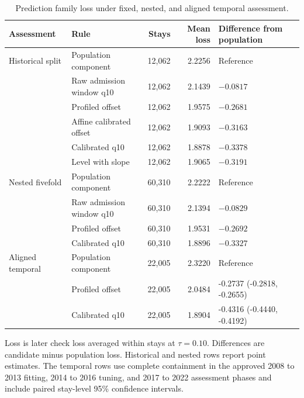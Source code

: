 \begin{table}[!htbp]
\caption{Prediction family loss under fixed, nested, and aligned temporal assessment.}
\label{tab:primary_prediction_comparison}
\centering
\footnotesize
\setlength{\tabcolsep}{4pt}
\begin{tabular}{llrrl}
\toprule
Assessment & Rule & Stays & Mean loss & Difference from population\\
\midrule
Historical split & Population component & 12,062 & 2.2256 & Reference\\
 & Raw admission window q10 & 12,062 & 2.1439 & $-0.0817$\\
 & Profiled offset & 12,062 & 1.9575 & $-0.2681$\\
 & Affine calibrated offset & 12,062 & 1.9093 & $-0.3163$\\
 & Calibrated q10 & 12,062 & 1.8878 & $-0.3378$\\
 & Level with slope & 12,062 & 1.9065 & $-0.3191$\\
\addlinespace
Nested fivefold & Population component & 60,310 & 2.2222 & Reference\\
 & Raw admission window q10 & 60,310 & 2.1394 & $-0.0829$\\
 & Profiled offset & 60,310 & 1.9531 & $-0.2692$\\
 & Calibrated q10 & 60,310 & 1.8896 & $-0.3327$\\
\addlinespace
Aligned temporal & Population component & 22,005 & 2.3220 & Reference\\
 & Profiled offset & 22,005 & 2.0484 & -0.2737 (-0.2818, -0.2655)\\
 & Calibrated q10 & 22,005 & 1.8904 & -0.4316 (-0.4440, -0.4192)\\
\bottomrule
\end{tabular}
\par\smallskip
\footnotesize{Loss is later check loss averaged within stays at $\tau=0.10$. Differences are candidate minus population loss. Historical and nested rows report point estimates. The temporal rows use complete containment in the approved 2008 to 2013 fitting, 2014 to 2016 tuning, and 2017 to 2022 assessment phases and include paired stay-level 95\% confidence intervals.}
\end{table}

